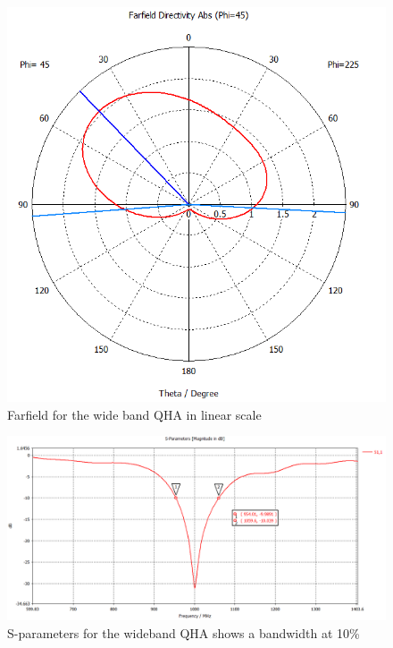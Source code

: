 \begin{figure}[H]
\centering 
\includegraphics[scale = 0.4]{figures/antennas/qha/wideband_ff}
\caption{Farfield for the wide band QHA in linear scale}
\label{fig:WB_QHA_ff}
\end{figure}   

\begin{figure}[H]
\centering 
\includegraphics[scale = 0.4]{figures/antennas/qha/wideband_spar}
\caption{S-parameters for the wideband QHA shows a bandwidth at 10\%}
\label{fig:WB_QHA_spar}
\end{figure} 


